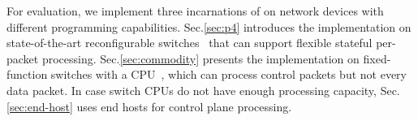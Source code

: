 
For evaluation, we implement three incarnations of \sys on network devices with different programming capabilities.
Sec.\ref{sec:p4} introduces the implementation on state-of-the-art reconfigurable switches~\cite{tofino,cavium} that can support flexible stateful per-packet processing.
Sec.\ref{sec:commodity} presents the implementation on fixed-function switches with a CPU~\cite{arista}, which can process control packets but not every data packet.
In case switch CPUs do not have enough processing capacity, Sec.\ref{sec:end-host} uses end hosts for control plane processing.




